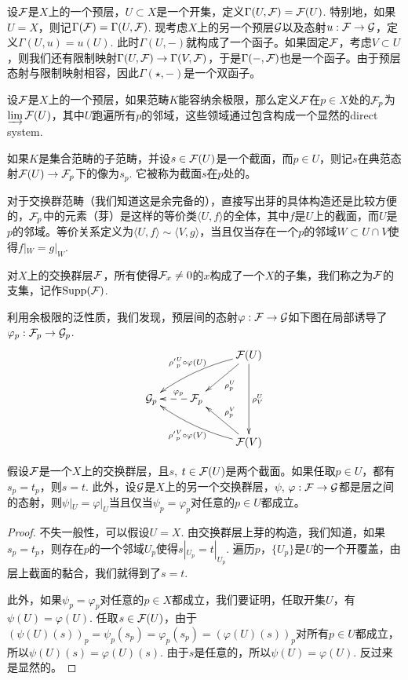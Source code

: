 \begin{para}[截面函子]
设$\mathcal{F}$是$X$上的一个预层，$U\subset X$是一个开集，定义$\Gamma(U,\mathcal{F})=\mathcal{F}(U)$. 特别地，如果$U=X$，则记$\Gamma(\mathcal{F})=\Gamma(U,\mathcal{F})$. 现考虑$X$上的另一个预层$\mathcal{G}$以及态射$u:\mathcal{F}\to\mathcal{G}$，定义$\Gamma(U,u)=u(U)$. 此时$\Gamma(U,-)$就构成了一个函子。如果固定$\mathcal{F}$，考虑$V\subset U$，则我们还有限制映射$\Gamma(U,\mathcal{F})\to\Gamma(V,\mathcal{F})$，于是$\Gamma(-,\mathcal{F})$也是一个函子。由于预层态射与限制映射相容，因此$\Gamma(\star,-)$是一个双函子。
\end{para}

\begin{para}[茎]
设$\mathcal{F}$是$X$上的一个预层，如果范畴$K$能容纳余极限，那么定义$\mathcal{F}$在$p\in X$处的$\mathcal{F}_p$为$\varinjlim \mathcal{F}(U)$，其中$U$跑遍所有$p$的邻域，这些领域通过包含构成一个显然的direct system. 

如果$K$是集合范畴的子范畴，并设$s\in \mathcal{F}(U)$是一个截面，而$p\in U$，则记$s$在典范态射$\mathcal{F}(U)\to \mathcal{F}_p$下的像为$s_p$. 它被称为截面$s$在$p$处的。

对于交换群范畴（我们知道这是余完备的），直接写出芽的具体构造还是比较方便的，$\mathcal{F}_p$中的元素（芽）是这样的等价类$\langle U,f\rangle$的全体，其中$f$是$U$上的截面，而$U$是$p$的邻域。等价关系定义为$\langle U,f\rangle\sim \langle V,g\rangle$，当且仅当存在一个$p$的邻域$W\subset U\cap V$使得$f|_W=g|_W$. 

对$X$上的交换群层$\mathcal{F}$，所有使得$\mathcal{F}_x\neq 0$的$x$构成了一个$X$的子集，我们称之为$\mathcal{F}$的支集，记作$\mathrm{Supp}(\mathcal{F})$.
\end{para}

利用余极限的泛性质，我们发现，预层间的态射$\varphi:\mathcal{F}\to\mathcal{G}$如下图在局部诱导了$\varphi_p:\mathcal{F}_p\to\mathcal{G}_p$.
\[
	\xymatrix{
		&&\calf(U)\ar[dl]^{\rho^U_{p}}\ar[dd]^{\rho^U_{V}}\ar@/_/[lld]_{{\rho'}^U_{p}\circ\varphi(U)} \\
		\calg_p&\calf_p\ar@{-->}[l]_(0.4){\varphi_p}&\\
		&&\calf(V)\ar[ul]_{\rho^V_{p}}\ar@/^/[llu]^{{\rho'}^V_{p}\circ\varphi(V)}
	}
\]

\begin{lem}\label{lem:1}
假设$\mathcal{F}$是一个$X$上的交换群层，且$s$, $t\in \mathcal{F}(U)$是两个截面。如果任取$p\in U$，都有$s_p=t_p$，则$s=t$. 此外，设$\mathcal{G}$是$X$上的另一个交换群层，$\psi$, $\varphi:\mathcal{F}\to\mathcal{G}$都是层之间的态射，则$\psi|_U=\varphi|_U$当且仅当$\psi_p=\varphi_p$对任意的$p\in U$都成立。
\end{lem}

\begin{proof}
不失一般性，可以假设$U=X$. 由交换群层上芽的构造，我们知道，如果$s_p=t_p$，则存在$p$的一个邻域$U_p$使得$s|_{U_p}=t|_{U_p}$. 遍历$p$，$\{U_p\}$是$U$的一个开覆盖，由层上截面的黏合，我们就得到了$s=t$.

此外，如果$\psi_p=\varphi_p$对任意的$p\in X$都成立，我们要证明，任取开集$U$，有$\psi(U)=\varphi(U)$. 任取$s\in \mathcal{F}(U)$，由于$(\psi(U)(s))_p=\psi_p(s_p)=\varphi_p(s_p)=(\varphi(U)(s))_p$对所有$p\in U$都成立，所以$\psi(U)(s)=\varphi(U)(s)$. 由于$s$是任意的，所以$\psi(U)=\varphi(U)$. 反过来是显然的。
\end{proof}

